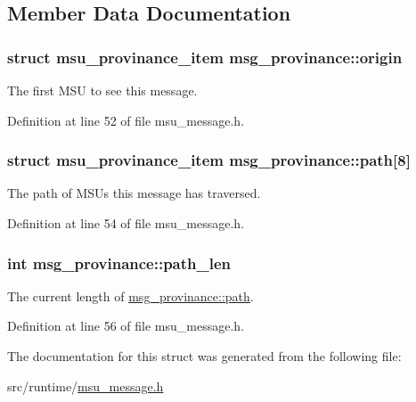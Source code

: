 \subsection{Member Data Documentation}
\hypertarget{structmsg__provinance_a974d9fb93121e018c61b38d884b11976}{
\subsubsection[{origin}]{\setlength{\rightskip}{0pt plus 5cm}struct {\bf msu\-\_\-provinance\-\_\-item} msg\-\_\-provinance\-::origin}}\label{structmsg__provinance_a974d9fb93121e018c61b38d884b11976}


The first M\-S\-U to see this message. 



Definition at line 52 of file msu\-\_\-message.\-h.

\hypertarget{structmsg__provinance_a34afbc25ce0a338c85a16c9c2cc313db}{
\subsubsection[{path}]{\setlength{\rightskip}{0pt plus 5cm}struct {\bf msu\-\_\-provinance\-\_\-item} msg\-\_\-provinance\-::path\mbox{[}8\mbox{]}}}\label{structmsg__provinance_a34afbc25ce0a338c85a16c9c2cc313db}


The path of M\-S\-Us this message has traversed. 



Definition at line 54 of file msu\-\_\-message.\-h.

\hypertarget{structmsg__provinance_af76b2286a3dd70ce44114aff1b3684a0}{
\subsubsection[{path\-\_\-len}]{\setlength{\rightskip}{0pt plus 5cm}int msg\-\_\-provinance\-::path\-\_\-len}}\label{structmsg__provinance_af76b2286a3dd70ce44114aff1b3684a0}


The current length of \hyperlink{structmsg__provinance_a34afbc25ce0a338c85a16c9c2cc313db}{msg\-\_\-provinance\-::path}. 



Definition at line 56 of file msu\-\_\-message.\-h.



The documentation for this struct was generated from the following file\-:\begin{DoxyCompactItemize}
\item 
src/runtime/\hyperlink{msu__message_8h}{msu\-\_\-message.\-h}\end{DoxyCompactItemize}
